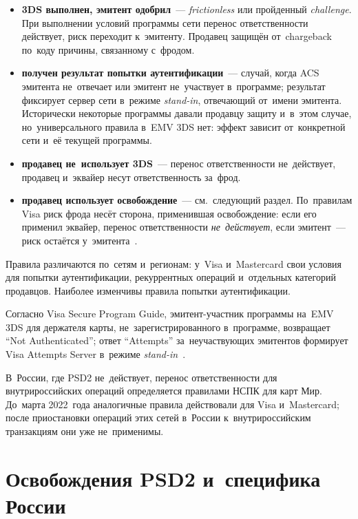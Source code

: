 \begin{itemize}
  \item \textbf{3DS выполнен, эмитент одобрил}~--- \textit{frictionless} или
    пройденный \textit{challenge}. При выполнении условий программы сети перенос
    ответственности действует, риск переходит к~эмитенту. Продавец защищён
    от~chargeback по~коду причины, связанному с~фродом.
  \item \textbf{получен результат попытки аутентификации}~--- случай, когда
    ACS эмитента не~отвечает или эмитент
    не~участвует в~программе; результат фиксирует сервер сети в~режиме
    \textit{stand-in}, отвечающий от~имени эмитента. Исторически некоторые
    программы давали продавцу защиту и~в~этом случае, но~универсального
    правила в~EMV 3DS нет: эффект зависит от~конкретной сети и~её текущей
    программы.
  \item \textbf{продавец не~использует 3DS}~--- перенос ответственности
    не~действует, продавец и~эквайер несут ответственность за~фрод.
  \item \textbf{продавец использует освобождение}~--- см.~следующий раздел.
    По~правилам Visa риск фрода несёт сторона, применившая освобождение: если
    его применил эквайер, перенос ответственности \emph{не~действует}, если
    эмитент~--- риск остаётся у~эмитента~\cite{visa-psd2-sca-2018}.
\end{itemize}

Правила различаются по~сетям и~регионам: у~Visa и~Mastercard свои условия для
попытки аутентификации, рекуррентных операций и~отдельных категорий продавцов.
Наиболее изменчивы правила попытки аутентификации.

Согласно Visa Secure Program Guide, эмитент-участник программы на~EMV 3DS
для держателя карты, не~зарегистрированного в~программе, возвращает
\enquote{Not Authenticated}; ответ \enquote{Attempts}
за~неучаствующих эмитентов формирует Visa Attempts Server в~режиме
\textit{stand-in}~\cite{visa-secure-rules-update}.

В~России, где PSD2 не~действует, перенос ответственности для внутрироссийских
операций определяется правилами НСПК для карт Мир. До~марта 2022~года
аналогичные правила действовали для Visa и~Mastercard; после приостановки
операций этих сетей в~России к~внутрироссийским транзакциям они уже
не~применимы.

\section{Освобождения PSD2 и~специфика России}\label{sec:3ds-exemptions}


